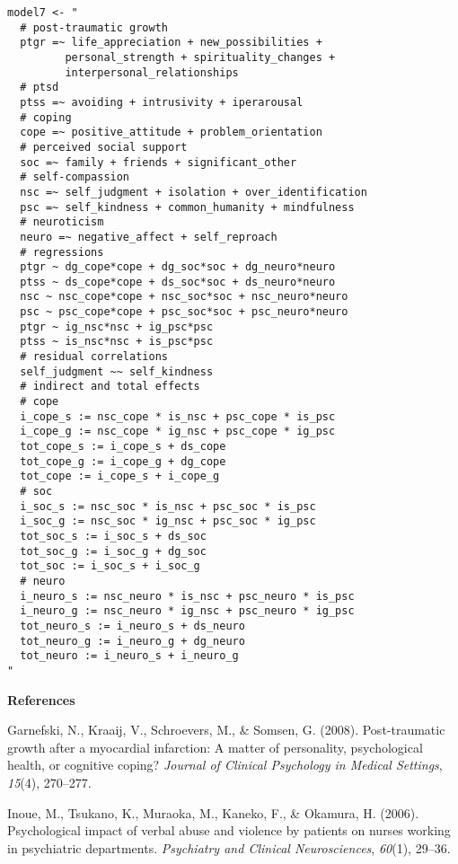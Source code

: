 \begin{appendix}
\begin{verbatim}
model7 <- "
  # post-traumatic growth
  ptgr =~ life_appreciation + new_possibilities + 
         personal_strength + spirituality_changes + 
         interpersonal_relationships
  # ptsd
  ptss =~ avoiding + intrusivity + iperarousal
  # coping
  cope =~ positive_attitude + problem_orientation 
  # perceived social support
  soc =~ family + friends + significant_other
  # self-compassion
  nsc =~ self_judgment + isolation + over_identification
  psc =~ self_kindness + common_humanity + mindfulness
  # neuroticism
  neuro =~ negative_affect + self_reproach
  # regressions
  ptgr ~ dg_cope*cope + dg_soc*soc + dg_neuro*neuro
  ptss ~ ds_cope*cope + ds_soc*soc + ds_neuro*neuro
  nsc ~ nsc_cope*cope + nsc_soc*soc + nsc_neuro*neuro
  psc ~ psc_cope*cope + psc_soc*soc + psc_neuro*neuro
  ptgr ~ ig_nsc*nsc + ig_psc*psc 
  ptss ~ is_nsc*nsc + is_psc*psc
  # residual correlations
  self_judgment ~~ self_kindness
  # indirect and total effects
  # cope
  i_cope_s := nsc_cope * is_nsc + psc_cope * is_psc
  i_cope_g := nsc_cope * ig_nsc + psc_cope * ig_psc
  tot_cope_s := i_cope_s + ds_cope
  tot_cope_g := i_cope_g + dg_cope
  tot_cope := i_cope_s + i_cope_g
  # soc
  i_soc_s := nsc_soc * is_nsc + psc_soc * is_psc
  i_soc_g := nsc_soc * ig_nsc + psc_soc * ig_psc
  tot_soc_s := i_soc_s + ds_soc
  tot_soc_g := i_soc_g + dg_soc
  tot_soc := i_soc_s + i_soc_g
  # neuro
  i_neuro_s := nsc_neuro * is_nsc + psc_neuro * is_psc
  i_neuro_g := nsc_neuro * ig_nsc + psc_neuro * ig_psc
  tot_neuro_s := i_neuro_s + ds_neuro
  tot_neuro_g := i_neuro_g + dg_neuro
  tot_neuro := i_neuro_s + i_neuro_g
"
\end{verbatim}

\newpage

\begin{center}
\textbf{References}
\end{center}
\bigskip

\hypertarget{refs}{}
\begin{CSLReferences}{1}{0}
\leavevmode\hypertarget{ref-garnefski2008post}{}%
Garnefski, N., Kraaij, V., Schroevers, M., \& Somsen, G. (2008).
Post-traumatic growth after a myocardial infarction: A matter of
personality, psychological health, or cognitive coping? \emph{Journal of
Clinical Psychology in Medical Settings}, \emph{15}(4), 270--277.

\leavevmode\hypertarget{ref-inoue2006psychological}{}%
Inoue, M., Tsukano, K., Muraoka, M., Kaneko, F., \& Okamura, H. (2006).
Psychological impact of verbal abuse and violence by patients on nurses
working in psychiatric departments. \emph{Psychiatry and Clinical
Neurosciences}, \emph{60}(1), 29--36.


\end{CSLReferences}
\end{appendix}
